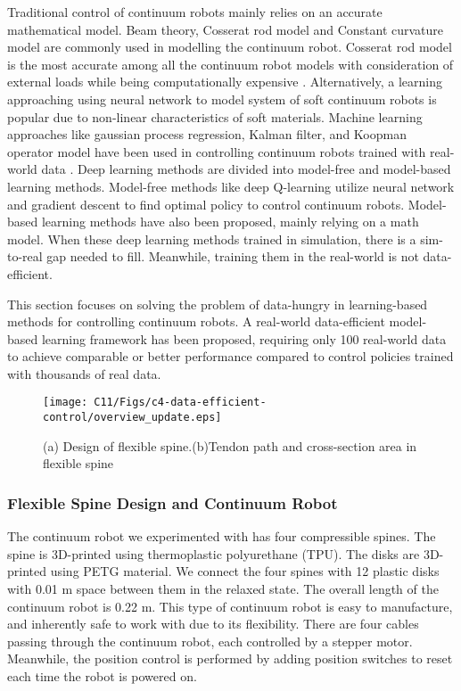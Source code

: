 Traditional control of continuum robots mainly relies on an accurate mathematical model. Beam theory, Cosserat rod model and Constant curvature model are commonly used in modelling the continuum robot. Cosserat rod model is the most accurate among all the continuum robot models with consideration of external loads while being computationally expensive \cite{rao2021model} \cite{till2019real}. Alternatively, a learning approaching using neural network to model system of soft continuum robots is popular due to non-linear characteristics of soft materials. Machine learning approaches like gaussian process regression, Kalman filter, and Koopman operator model have been used in controlling continuum robots trained with real-world data  \cite{fang2019vision}\cite{deisenroth2011pilco}\cite{sabelhaus2021gaussian}\cite{li2017model}. Deep learning methods are divided into model-free and model-based learning methods. Model-free methods like deep Q-learning utilize neural network and gradient descent to find optimal policy to control continuum robots. Model-based learning methods have also been proposed, mainly relying on a math model. When these deep learning methods trained in simulation, there is a sim-to-real gap needed to fill. Meanwhile, training them in the real-world is not data-efficient. 

This section focuses on solving the problem of data-hungry in learning-based methods for controlling continuum robots. A real-world data-efficient model-based learning framework has been proposed, requiring only 100 real-world data to achieve comparable or better performance compared to control policies trained with thousands of real data. 
\begin{figure*}[ht!]
 \centering
 \texttt{[image: C11/Figs/c4-data-efficient-control/overview\_update.eps]} 
 \caption{(a) Design of flexible spine.(b)Tendon path and cross-section area in flexible spine}
 \label{fig:X1}
\end{figure*}




\subsubsection{Flexible Spine Design and Continuum Robot}

The continuum robot we experimented with has four compressible spines. The spine is 3D-printed using thermoplastic polyurethane (TPU). The disks are 3D-printed using PETG material. We connect the four spines with 12 plastic disks with 0.01 m space between them in the relaxed state. The overall length of the continuum robot is 0.22 m. This type of continuum robot is easy to manufacture, and inherently safe to work with due to its flexibility. There are four cables passing through the continuum robot, each controlled by a stepper motor. Meanwhile, the position control is performed by adding position switches to reset each time the robot is powered on. 

